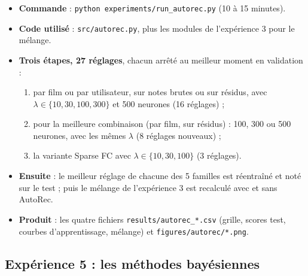 \documentclass[11pt,a4paper]{article}
\begin{document}
\begin{itemize}
  \item \textbf{Commande} : \texttt{python experiments/run\_autorec.py} (10 à 15 minutes).
  \item \textbf{Code utilisé} : \texttt{src/autorec.py}, plus les modules de l'expérience 3
        pour le mélange.
  \item \textbf{Trois étapes, 27 réglages}, chacun arrêté au meilleur moment en validation :
  \begin{enumerate}
    \item par film ou par utilisateur, sur notes brutes ou sur résidus, avec
          $\lambda \in \{10, 30, 100, 300\}$ et 500 neurones (16 réglages) ;
    \item pour la meilleure combinaison (par film, sur résidus) : 100, 300 ou 500 neurones,
          avec les mêmes $\lambda$ (8 réglages nouveaux) ;
    \item la variante \og Sparse FC \fg avec $\lambda \in \{10, 30, 100\}$ (3 réglages).
  \end{enumerate}
  \item \textbf{Ensuite} : le meilleur réglage de chacune des 5 familles est réentraîné et
        noté sur le test ; puis le mélange de l'expérience 3 est recalculé avec et sans
        AutoRec.
  \item \textbf{Produit} : les quatre fichiers \texttt{results/autorec\_*.csv} (grille, scores
        test, courbes d'apprentissage, mélange) et \texttt{figures/autorec/*.png}.
\end{itemize}

\subsection{Expérience 5 : les méthodes bayésiennes}
\end{document}
